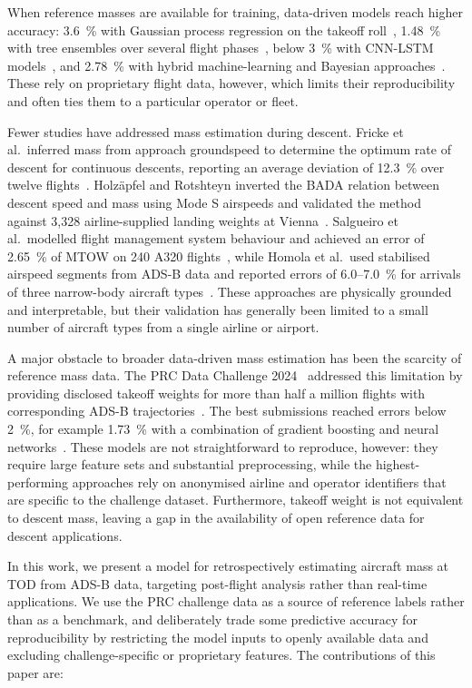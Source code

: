 \documentclass[
  manuscript=proceedings,  %
  layout=preprint,  %
  year=2026,
  volume=x,
]{extra/joas}
\begin{document}
When reference masses are available for training, data-driven models reach higher accuracy: 3.6~\% with Gaussian process regression on the takeoff roll~\cite{chati2018gaussian}, 1.48~\% with tree ensembles over several flight phases~\cite{ayzit2023generalizable}, below 3~\% with CNN-LSTM models~\cite{daga2024cnnlstm}, and 2.78~\% with hybrid machine-learning and Bayesian approaches~\cite{wang2025kmidnnbi}. These rely on proprietary flight data, however, which limits their reproducibility and often ties them to a particular operator or fleet.

Fewer studies have addressed mass estimation during descent. Fricke et al.\ inferred mass from approach groundspeed to determine the optimum rate of descent for continuous descents, reporting an average deviation of 12.3~\% over twelve flights~\cite{fricke2015cdo}. Holzäpfel and Rotshteyn inverted the BADA relation between descent speed and mass using Mode S airspeeds and validated the method against 3{,}328 airline-supplied landing weights at Vienna~\cite{holzapfel2023landing}. Salgueiro et al.\ modelled flight management system behaviour and achieved an error of 2.65~\% of MTOW on 240 A320 flights~\cite{salgueiro2025weight}, while Homola et al.\ used stabilised airspeed segments from ADS-B data and reported errors of 6.0--7.0~\% for arrivals of three narrow-body aircraft types~\cite{homola2025airspeed}. These approaches are physically grounded and interpretable, but their validation has generally been limited to a small number of aircraft types from a single airline or airport.

A major obstacle to broader data-driven mass estimation has been the scarcity of reference mass data. The PRC Data Challenge 2024~\cite{prc2024} addressed this limitation by providing disclosed takeoff weights for more than half a million flights with corresponding ADS-B trajectories~\cite{schafer2014bringing}. The best submissions reached errors below 2~\%, for example 1.73~\% with a combination of gradient boosting and neural networks~\cite{murca2025open}. These models are not straightforward to reproduce, however: they require large feature sets and substantial preprocessing, while the highest-performing approaches rely on anonymised airline and operator identifiers that are specific to the challenge dataset. Furthermore, takeoff weight is not equivalent to descent mass, leaving a gap in the availability of open reference data for descent applications.

In this work, we present a model for retrospectively estimating aircraft mass at TOD from ADS-B data, targeting post-flight analysis rather than real-time applications. We use the PRC challenge data as a source of reference labels rather than as a benchmark, and deliberately trade some predictive accuracy for reproducibility by restricting the model inputs to openly available data and excluding challenge-specific or proprietary features. The contributions of this paper are:
\end{document}
